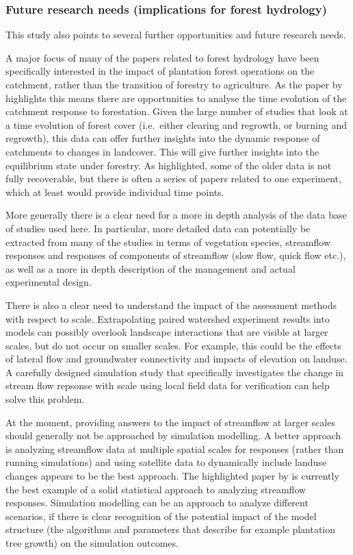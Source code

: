 \documentclass[]{elsarticle} %
\begin{document}
\hypertarget{future-research-needs-implications-for-forest-hydrology}{%
\subsubsection{Future research needs (implications for forest hydrology)}\label{future-research-needs-implications-for-forest-hydrology}}

This study also points to several further opportunities and future research needs.

A major focus of many of the papers related to forest hydrology have been specifically interested in the impact of plantation forest operations on the catchment, rather than the transition of forestry to agriculture. As the paper by \citet{jones2017} highlights this means there are opportunities to analyse the time evolution of the catchment response to forestation. Given the large number of studies that look at a time evolution of forest cover (i.e.~either clearing and regrowth, or burning and regrowth), this data can offer further insights into the dynamic response of catchments to changes in landcover. This will give further insights into the equilibrium state under forestry. As highlighted, some of the older data is not fully recoverable, but there is often a series of papers related to one experiment, which at least would provide individual time points.

More generally there is a clear need for a more in depth analysis of the data base of studies used here. In particular, more detailed data can potentially be extracted from many of the studies in terms of vegetation species, streamflow responses and responses of components of streamflow (slow flow, quick flow etc.), as well as a more in depth description of the management and actual experimental design.

There is also a clear need to understand the impact of the assessment methods with respect to scale. Extrapolating paired watershed experiment results into models can possibly overlook landscape interactions that are visible at larger scales, but do not occur on smaller scales. For example, this could be the effects of lateral flow and groundwater connectivity and impacts of elevation on landuse. A carefully designed simulation study that specifically investigates the change in stream flow repsonse with scale using local field data for verification can help solve this problem.

At the moment, providing answers to the impact of streamflow at larger scales should generally not be approached by simulation modelling. A better approach is analyzing streamflow data at multiple spatial scales for responses (rather than running simulations) and using satellite data to dynamically include landuse changes appears to be the best approach. The highlighted paper by \citet{levy2018} is currently the best example of a solid statistical approach to analyzing streamflow responses. Simulation modelling can be an approach to analyze different scenarios, if there is clear recognition of the potential impact of the model structure (the algorithms and parameters that describe for example plantation tree growth) on the simulation outcomes.
\end{document}
